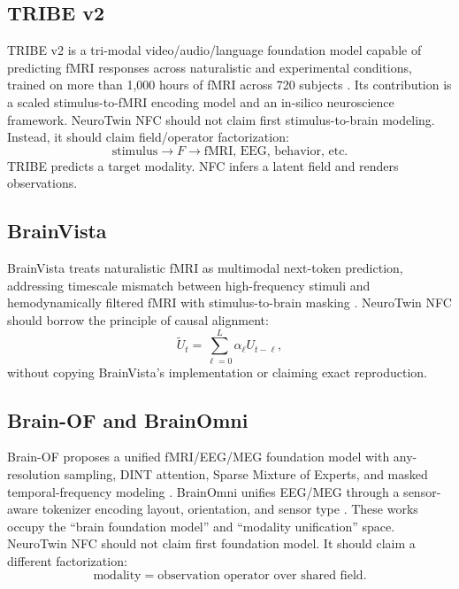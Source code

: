 \documentclass[11pt]{article}
\begin{document}
\subsection{TRIBE v2}

TRIBE v2 is a tri-modal video/audio/language foundation model capable of predicting fMRI responses across naturalistic and experimental conditions, trained on more than 1,000 hours of fMRI across 720 subjects \cite{tribev2}. Its contribution is a scaled stimulus-to-fMRI encoding model and an in-silico neuroscience framework. NeuroTwin NFC should not claim first stimulus-to-brain modeling. Instead, it should claim field/operator factorization:
\begin{equation}
\text{stimulus} \longrightarrow F \longrightarrow \text{fMRI, EEG, behavior, etc.}
\end{equation}
TRIBE predicts a target modality. NFC infers a latent field and renders observations.

\subsection{BrainVista}

BrainVista treats naturalistic fMRI as multimodal next-token prediction, addressing timescale mismatch between high-frequency stimuli and hemodynamically filtered fMRI with stimulus-to-brain masking \cite{brainvista}. NeuroTwin NFC should borrow the principle of causal alignment:
\begin{equation}
\tilde{U}_t = \sum_{\ell=0}^L \alpha_\ell U_{t-\ell},
\end{equation}
without copying BrainVista's implementation or claiming exact reproduction.

\subsection{Brain-OF and BrainOmni}

Brain-OF proposes a unified fMRI/EEG/MEG foundation model with any-resolution sampling, DINT attention, Sparse Mixture of Experts, and masked temporal-frequency modeling \cite{brainof}. BrainOmni unifies EEG/MEG through a sensor-aware tokenizer encoding layout, orientation, and sensor type \cite{brainomni}. These works occupy the ``brain foundation model'' and ``modality unification'' space. NeuroTwin NFC should not claim first foundation model. It should claim a different factorization:
\begin{equation}
\text{modality} = \text{observation operator over shared field}.
\end{equation}
\end{document}
